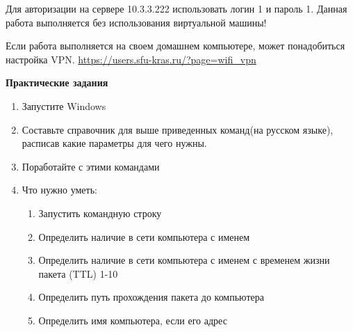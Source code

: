 \documentclass[a4paper,12pt]{article}
\begin{document}
  \begin{flushleft}
   Для авторизации на сервере 10.3.3.222 использовать логин 1 и пароль 1. Данная работа выполняется без использования виртуальной машины!
  \end{flushleft}

  \begin{flushleft}
   Если работа выполняется на своем домашнем компьютере, может понадобиться настройка VPN. \url{https://users.sfu-kras.ru/?page=wifi\_vpn}
  \end{flushleft}

  \newpage

  \begin{center}
    {\bf Практические задания}
  \end{center}

  \begin{flushleft}
    \begin{enumerate} [1. ]
     \item Запустите Windows
     \item Составьте справочник для выше приведенных команд(на русском языке), расписав какие параметры для чего нужны.
     \item Поработайте с этими командами
     \item Что нужно уметь:
      \begin{enumerate} [\bf a. ]
        \item Запустить командную строку
        \item Определить наличие в сети компьютера с именем 
        \begin{flushleft}
        \end{flushleft}
        \item Определить наличие в сети компьютера с именем  с временем жизни пакета (TTL) 1-10
        \begin{flushleft}
        \end{flushleft}
        \item Определить путь прохождения пакета до компьютера 
        \begin{flushleft}
        \end{flushleft}
        \item Определить имя компьютера, если его адрес 
        \begin{flushleft}

\end{flushleft}
\end{enumerate}
\end{enumerate}
\end{flushleft}
\end{document}
